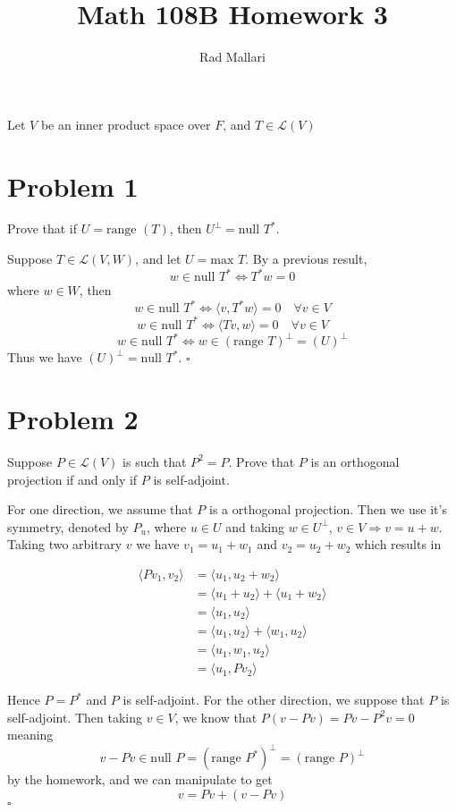 \documentclass[12pt]{article}
\title{Math 108B Homework 3}
\author{Rad Mallari}
\newenvironment{proof}{\noindent{\bf Proof.}}{\hfill $\square$\medskip}
\begin{document}
\maketitle
Let $V$ be an inner product space over $F$, and $T\in \mathcal{L}(V)$
\section{Problem 1}
Prove that if $U=\text{range }(T)$, then $U^{\perp}=\text{null }T^{*}$.

\begin{proof}
Suppose $T\in\mathcal{L}(V,W)$, and let $U=\text{max }T$. By a previous result,
$$w\in\text{null }T^{*}\Leftrightarrow T^{*}w=0$$
where $w\in W$, then
$$w\in\text{null }T^{*}\Leftrightarrow\langle v,T^{*}w\rangle=0\quad\forall v\in V$$
$$w\in\text{null }T^{*}\Leftrightarrow\langle Tv,w\rangle=0\quad\forall v\in V$$
$$w\in\text{null }T^{*}\Leftrightarrow w\in(\text{range }T)^{\perp}=(U)^{\perp}$$
Thus we have $(U)^{\perp}=\text{null }T^{*}$.
\end{proof}


\newpage
\section{Problem 2}
Suppose $P\in\mathcal{L}(V)$ is such that $P^{2}=P$. Prove that $P$ is an orthogonal projection if and only if $P$ is self-adjoint.

\begin{proof}
For one direction, we assume that $P$ is a orthogonal projection. Then we use it's symmetry, denoted by $P_{u}$, where $u\in U$ and taking $w\in U^{\perp}$, $v\in V\Rightarrow v=u+w$. Taking two arbitrary $v$ we have $v_{1}=u_{1}+w_{1}$ and $v_{2}=u_{2}+w_{2}$ which results in
    
\begin{equation}
\begin{split}
\langle Pv_{1},v_{2}\rangle & =\langle u_{1},u_{2}+w_{2}\rangle \\
&=\langle u_{1}+u_{2}\rangle+\langle u_{1}+w_{2}\rangle \\
&=\langle u_{1},u_{2}\rangle \\
&=\langle u_{1},u_{2}\rangle+\langle w_{1},u_{2}\rangle \\
&=\langle u_{1},w_{1},u_{2}\rangle \\
&=\langle u_{1},Pv_{2}\rangle
\end{split}
\end{equation}

Hence $P=P^{*}$ and $P$ is self-adjoint.
For the other direction, we suppose that $P$ is self-adjoint. Then taking $v\in V$, we know that $P(v-Pv)=Pv-P^{2}v=0$ meaning
$$v-Pv\in\text{null }P=(\text{range }P^{*})^{\perp}=(\text{range }P)^{\perp}$$
by the homework, and we can manipulate to get
$$v=Pv+(v-Pv)$$
\end{proof}
\end{document}

